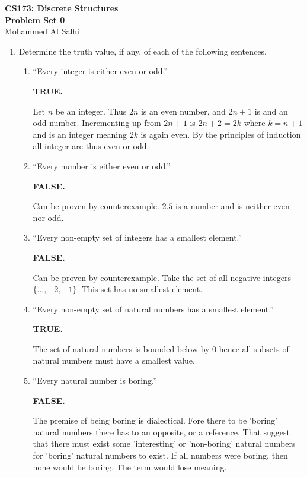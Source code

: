 \documentclass[12pt]{article}
\renewcommand{\maketitle}{%
  \begin{flushleft}
    {\Large\bfseries CS173: Discrete Structures}\\[0.3em]
    {\Large\bfseries Problem Set 0}\\[0.5em]
    {\normalsize Mohammed Al Salhi}
  \end{flushleft}
  \vspace{1em}
}
\begin{document}
\maketitle

\begin{enumerate}[left=0pt, itemsep=2em, parsep=1em]
  \item
    Determine the truth value, if any, of each of the following sentences.
    
    \begin{enumerate}[label=(\alph*), itemsep=1.5em, leftmargin=2em]
      \item
        ``Every integer is either even or odd.''
        
        \textbf{TRUE.}
        
        Let $n$ be an integer. Thus $2n$ is an even number, and $2n+1$ is and an odd number. Incrementing up from $2n+1$ is $2n+2 = 2k$ where $k=n+1$ and is an integer meaning $2k$ is again even. By the principles of induction all integer are thus even or odd. 
    
      \item
        ``Every number is either even or odd.''
        
        \textbf{FALSE.}
        
        Can be proven by counterexample. $2.5$ is a number and is neither even nor odd. 
        
      \item
        ``Every non-empty set of integers has a smallest element.''
        
        \textbf{FALSE.}
        
        Can be proven by counterexample. Take the set of all negative integers $\{\ldots, -2, -1\}$. This set has no smallest element.
        
      \item
        ``Every non-empty set of natural numbers has a smallest element.''
        
        \textbf{TRUE.}
        
        The set of natural numbers is bounded below by $0$ hence all subsets of natural numbers must have a smallest value. 
        
      \item
        ``Every natural number is boring.''
        
        \textbf{FALSE.}
        
        The premise of being boring is dialectical. Fore there to be 'boring' natural numbers there has to an opposite, or a reference. That suggest that there must exist some 'interesting' or 'non-boring' natural numbers for 'boring' natural numbers to exist. If all numbers were boring, then none would be boring. The term would lose meaning.
        

\end{enumerate}
\end{enumerate}
\end{document}
